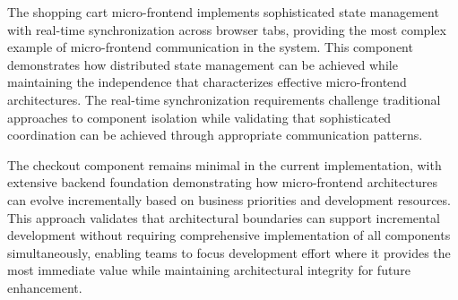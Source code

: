 \documentclass[12pt,a4paper]{report}
\begin{document}
The shopping cart micro-frontend implements sophisticated state management with real-time synchronization across browser tabs, providing the most complex example of micro-frontend communication in the system. This component demonstrates how distributed state management can be achieved while maintaining the independence that characterizes effective micro-frontend architectures. The real-time synchronization requirements challenge traditional approaches to component isolation while validating that sophisticated coordination can be achieved through appropriate communication patterns.

The checkout component remains minimal in the current implementation, with extensive backend foundation demonstrating how micro-frontend architectures can evolve incrementally based on business priorities and development resources. This approach validates that architectural boundaries can support incremental development without requiring comprehensive implementation of all components simultaneously, enabling teams to focus development effort where it provides the most immediate value while maintaining architectural integrity for future enhancement.
\end{document}
